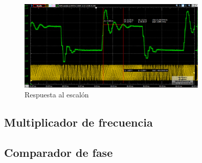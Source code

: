 \documentclass[10pt,a4paper]{article}
\begin{document}
\begin{figure}[h!]
	\includegraphics[width= 0.8\textwidth]{../1. PLL/Imagenes/RespEscalonMedicion.png}
	\centering
	\caption{Respuesta al escalón}
	\label{fig:REspEscalon}
\end{figure}

\subsection{Multiplicador de frecuencia}



\subsection{Comparador de fase}
\end{document}
